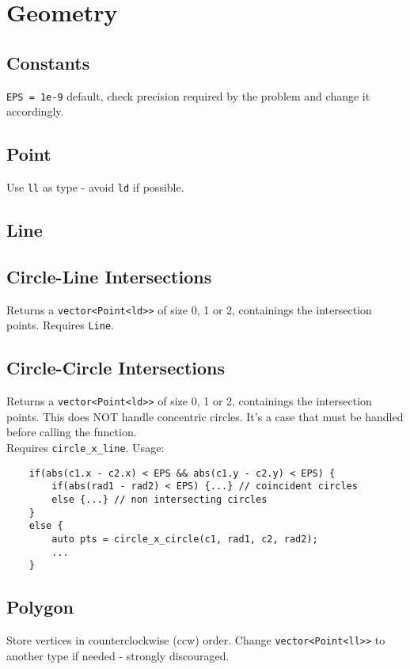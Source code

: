 \section{Geometry}

\subsection{Constants}
\verb|EPS = 1e-9| default, check precision required by the problem and
change it accordingly.


\subsection{Point}
Use \verb|ll| as type - avoid \verb|ld| if possible.

\subsection{Line}

\subsection{Circle-Line Intersections}
Returns a \verb|vector<Point<ld>>| of size 0, 1 or 2, containings the intersection points.
Requires \verb|Line|.


\subsection{Circle-Circle Intersections}
Returns a \verb|vector<Point<ld>>| of size 0, 1 or 2, containings the intersection points.
This does NOT handle concentric circles. It's a case that must be handled before calling the function.\\
Requires \verb|circle_x_line|. Usage:
\begin{lstlisting}
	if(abs(c1.x - c2.x) < EPS && abs(c1.y - c2.y) < EPS) {
		if(abs(rad1 - rad2) < EPS) {...} // coincident circles
		else {...} // non intersecting circles
	}
	else {
		auto pts = circle_x_circle(c1, rad1, c2, rad2);
		...
	}
\end{lstlisting}


\subsection{Polygon}
Store vertices in counterclockwise (ccw) order.
Change \verb|vector<Point<ll>>| to another type if needed - strongly discouraged.

